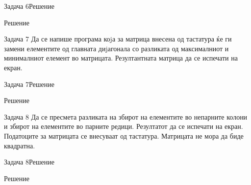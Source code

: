 \begin{frame}[fragile]{Задача 6}{Решение} 
\begin{exampleblock}{Решение}

\end{exampleblock}
\end{frame}


\begin{frame}{Задача 7}
Да се напише програма коjа за матрица внесена од тастатура ќе ги замени
елементите од главната диjагонала со разликата од максималниот и минималниот
елемент во матрицата. Резултантната матрица да се испечати на екран.
\end{frame}

\begin{frame}[fragile]{Задача 7}{Решение} 
\begin{exampleblock}{Решение}

\end{exampleblock}
\end{frame}

\begin{frame}{Задача 8}
Да се пресмета разликата на збирот на елементите во
непарните колони и збирот на елементите во парните редици.
Резултатот да се испечати на екран. Податоците за матрицата
се внесуваат од тастатура. Матрицата не мора да биде
квадратна.
\end{frame}

\begin{frame}[fragile]{Задача 8}{Решение} 
\begin{exampleblock}{Решение}

\end{exampleblock}
\end{frame}

\section{}

